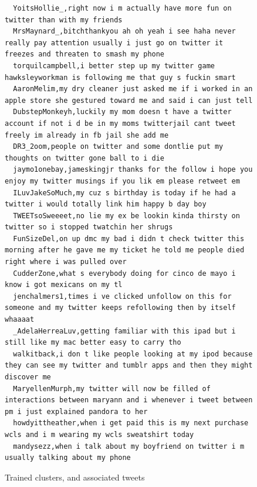 \begin{figure}[htpb]
\begin{verbatim}
  YoitsHollie_,right now i m actually have more fun on twitter than with my friends
  MrsMaynard_,bitchthankyou ah oh yeah i see haha never really pay attention usually i just go on twitter it freezes and threaten to smash my phone
  torquilcampbell,i better step up my twitter game hawksleyworkman is following me that guy s fuckin smart
  AaronMelim,my dry cleaner just asked me if i worked in an apple store she gestured toward me and said i can just tell
  DubstepMonkeyh,luckily my mom doesn t have a twitter account if not i d be in my moms twitterjail cant tweet freely im already in fb jail she add me
  DR3_2oom,people on twitter and some dontlie put my thoughts on twitter gone ball to i die
  jaymo1onebay,jameskingjr thanks for the follow i hope you enjoy my twitter musings if you lik em please retweet em
  ILuvJakeSoMuch,my cuz s birthday is today if he had a twitter i would totally link him happy b day boy
  TWEETsoSweeeet,no lie my ex be lookin kinda thirsty on twitter so i stopped twatchin her shrugs
  FunSizeDel,on up dmc my bad i didn t check twitter this morning after he gave me my ticket he told me people died right where i was pulled over
  CudderZone,what s everybody doing for cinco de mayo i know i got mexicans on my tl
  jenchalmers1,times i ve clicked unfollow on this for someone and my twitter keeps refollowing then by itself whaaaat
  _AdelaHerreaLuv,getting familiar with this ipad but i still like my mac better easy to carry tho
  walkitback,i don t like people looking at my ipod because they can see my twitter and tumblr apps and then they might discover me
  MaryellenMurph,my twitter will now be filled of interactions between maryann and i whenever i tweet between pm i just explained pandora to her
  howdyittheather,when i get paid this is my next purchase wcls and i m wearing my wcls sweatshirt today
  mandysezz,when i talk about my boyfriend on twitter i m usually talking about my phone
  \end{verbatim}
  \caption{Trained clusters, and associated tweets}
  \label{fig:clusterfuck}
\end{figure}     
\cleardoublepage

\cleardoublepage  
